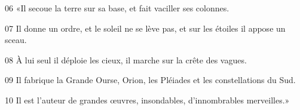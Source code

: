 
06 «Il secoue la terre sur sa base, et fait vaciller ses colonnes.

07 Il donne un ordre, et le soleil ne se lève pas, et sur les étoiles il appose un sceau.

08 À lui seul il déploie les cieux, il marche sur la crête des vagues.

09 Il fabrique la Grande Ourse, Orion, les Pléiades et les constellations du Sud.

10 Il est l’auteur de grandes œuvres, insondables, d’innombrables merveilles.»
